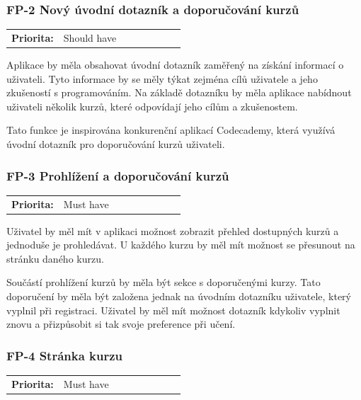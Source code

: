 \subsubsection{FP-2 Nový úvodní dotazník a doporučování kurzů}

\begin{tabular}{lp{0.7\linewidth}}
    \textbf{Priorita:} & Should have \\
\end{tabular}

Aplikace by měla obsahovat úvodní dotazník zaměřený na získání informací o uživateli. Tyto informace by se měly týkat zejména cílů uživatele a jeho zkušeností s programováním. Na základě dotazníku by měla aplikace nabídnout uživateli několik kurzů, které odpovídají jeho cílům a zkušenostem.

Tato funkce je inspirována konkurenční aplikací Codecademy, která využívá úvodní dotazník pro doporučování kurzů uživateli.

\subsubsection{FP-3 Prohlížení a doporučování kurzů}

\begin{tabular}{lp{0.7\linewidth}}
    \textbf{Priorita:} & Must have \\
\end{tabular}

Uživatel by měl mít v aplikaci možnost zobrazit přehled dostupných kurzů a jednoduše je prohledávat. U každého kurzu by měl mít možnost se přesunout na stránku daného kurzu.

Součástí prohlížení kurzů by měla být sekce s doporučenými kurzy. Tato doporučení by měla být založena jednak na úvodním dotazníku uživatele, který vyplnil při registraci. Uživatel by měl mít možnost dotazník kdykoliv vyplnit znovu a přizpůsobit si tak svoje preference při učení. %


\subsubsection{FP-4 Stránka kurzu}

\begin{tabular}{lp{0.7\linewidth}}
    \textbf{Priorita:} & Must have \\
\end{tabular}

